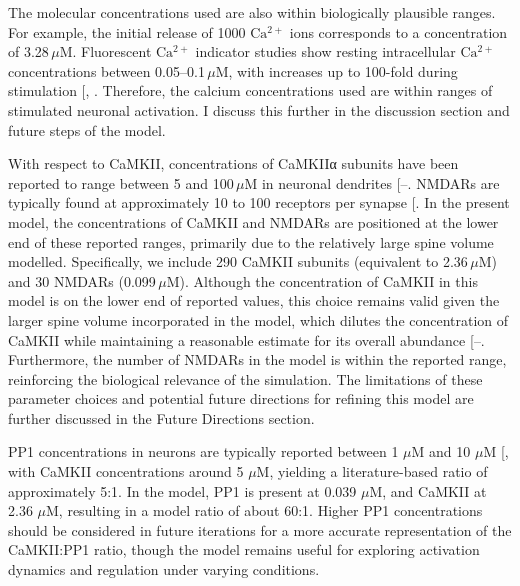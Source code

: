\documentclass[
  11pt,
  letterpaper,
]{scrreprt}
\begin{document}
The molecular concentrations used are also within biologically plausible
ranges. For example, the initial release of 1000 \(\mathrm{Ca^{2+}}\)
ions corresponds to a concentration of 3.28\,\(\mu\text{M}\).
Fluorescent \(\mathrm{Ca^{2+}}\) indicator studies show resting
intracellular \(\mathrm{Ca^{2+}}\) concentrations between
0.05--0.1\,\(\mu\text{M}\), with increases up to 100-fold during
stimulation {[},
\citeproc{ref-zheng2018Monitoring}{442}{]}. Therefore, the calcium
concentrations used are within ranges of stimulated neuronal activation.
I discuss this further in the discussion section and future steps of the
model.

With respect to CaMKII, concentrations of CaMKIIα subunits have been
reported to range between 5 and 100\,\(\mu\text{M}\) in neuronal
dendrites
{[}--\citeproc{ref-otmakhov2012Measuring}{445}{]}.
NMDARs are typically found at approximately 10 to 100 receptors per
synapse {[}\citeproc{ref-petralia2012Distribution}{446}{]}. In the
present model, the concentrations of CaMKII and NMDARs are positioned at
the lower end of these reported ranges, primarily due to the relatively
large spine volume modelled. Specifically, we include 290 CaMKII
subunits (equivalent to 2.36\,\(\mu\text{M}\)) and 30 NMDARs
(0.099\,\(\mu\text{M}\)). Although the concentration of CaMKII in this
model is on the lower end of reported values, this choice remains valid
given the larger spine volume incorporated in the model, which dilutes
the concentration of CaMKII while maintaining a reasonable estimate for
its overall abundance
{[}--\citeproc{ref-otmakhov2012Measuring}{445}{]}.
Furthermore, the number of NMDARs in the model is within the reported
range, reinforcing the biological relevance of the simulation. The
limitations of these parameter choices and potential future directions
for refining this model are further discussed in the Future Directions
section.

PP1 concentrations in neurons are typically reported between 1
\(\mu\text{M}\) and 10 \(\mu\text{M}\)
{[}\citeproc{ref-cohen2002Protein}{447}{]}, with CaMKII concentrations
around 5 \(\mu\text{M}\), yielding a literature-based ratio of
approximately 5:1. In the model, PP1 is present at 0.039
\(\mu\text{M}\), and CaMKII at 2.36 \(\mu\text{M}\), resulting in a
model ratio of about 60:1. Higher PP1 concentrations should be
considered in future iterations for a more accurate representation of
the CaMKII:PP1 ratio, though the model remains useful for exploring
activation dynamics and regulation under varying conditions.
\end{document}
